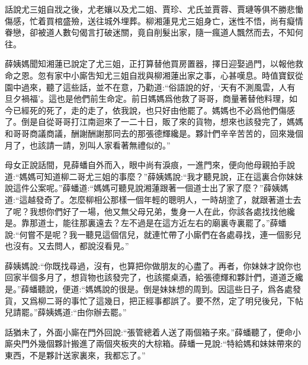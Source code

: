 
\begin{parag}
    話說尤三姐自戕之後，尤老孃以及尤二姐、賈珍、尤氏並賈蓉、賈璉等俱不勝悲慟傷感，忙着買棺盛殮，送往城外埋葬。柳湘蓮見尤三姐身亡，迷性不悟，尚有癡情眷戀，卻被道人數句偈言打破迷關，竟自削髮出家，隨一瘋道人飄然而去，不知何往。
\end{parag}


\begin{parag}
    薛姨媽聞知湘蓮已說定了尤三姐，正打算替他買房置器，擇日迎娶過門，以報他救命之恩。忽有家中小廝吿知尤三姐自戕與柳湘蓮出家之事，心甚嘆息。時值寶釵從園中過來，聽了這些話，並不在意，乃勸道:“俗語說的好，‘天有不測風雲，人有旦夕禍福’。這也是他們前生命定。前日媽媽爲他救了哥哥，商量著替他料理，如今已經死的死了，走的走了，依我說，也只好由他罷了。媽媽也不必爲他們傷感了。倒是自從哥哥打江南迴來了一二十日，販了來的貨物，想來也該發完了，媽媽和哥哥商議商議，酬謝酬謝那同去的那張德輝纔是。夥計們辛辛苦苦的，回來幾個月了，也該請一請，別叫人家看著無禮似的。”
\end{parag}


\begin{parag}
    母女正說話間，見薛蟠自外而入，眼中尚有淚痕，一進門來，便向他母親拍手說道:“媽媽可知道柳二哥尤三姐的事麼？”薛姨媽說:“我才聽見說，正在這裏合你妹妹說這件公案呢。”薛蟠道:“媽媽可聽見說湘蓮跟著一個道士出了家了麼？”薛姨媽道:“這越發奇了。怎麼柳相公那樣一個年輕的聰明人，一時胡塗了，就跟著道士去了呢？我想你們好了一場，他又無父母兄弟，隻身一人在此，你該各處找找他纔是。靠那道士，能往那裏遠去？左不過是在這方近左右的廟裏寺裏罷了。”薛蟠說:“何嘗不是呢？我一聽見這個信兒，就連忙帶了小廝們在各處尋找，連一個影兒也沒有。又去問人，都說沒看見。”
\end{parag}


\begin{parag}
    薛姨媽說:“你既找尋過，沒有，也算把你做朋友的心盡了。再者，你妹妹才說你也回家半個多月了，想貨物也該發完了，也該擺桌酒，給張德輝和夥計們，道道乏纔是。”薛蟠聽說，便道:“媽媽說的很是。倒是妹妹想的周到。因這些日子，爲各處發貨，又爲柳二哥的事忙了這幾日，把正經事都誤了。要不然，定了明兒後兒，下帖兒請罷。”薛姨媽道:“由你辦去罷。”
\end{parag}


\begin{parag}
    話猶未了，外面小廝在門外回說:“張管總着人送了兩個箱子來。”薛蟠聽了，便命小廝央門外幾個夥計搬進了兩個夾板夾的大棕箱。薛蟠一見說:“特給媽和妹妹帶來的東西，不是夥計送家裏來，我都忘了。”
\end{parag}


